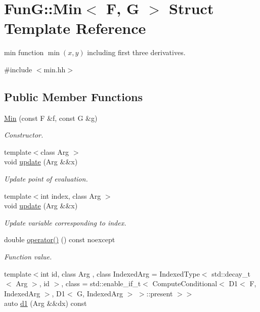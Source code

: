 \hypertarget{structFunG_1_1Min}{}\section{FunG\+:\+:Min$<$ F, G $>$ Struct Template Reference}
\label{structFunG_1_1Min}


min function $ \min(x,y) $ including first three derivatives.  




{\ttfamily \#include $<$min.\+hh$>$}

\subsection*{Public Member Functions}
\begin{DoxyCompactItemize}
\item 
\hyperlink{structFunG_1_1Min_afc46c17a7dfe4c0059c961d26c04ecaa}{Min} (const F \&f, const G \&g)
\begin{DoxyCompactList}\small\item\em Constructor. \end{DoxyCompactList}\item 
{\footnotesize template$<$class Arg $>$ }\\void \hyperlink{structFunG_1_1Min_a09c10a89b4f6c8129e08273f2048b352}{update} (Arg \&\&x)
\begin{DoxyCompactList}\small\item\em Update point of evaluation. \end{DoxyCompactList}\item 
{\footnotesize template$<$int index, class Arg $>$ }\\void \hyperlink{structFunG_1_1Min_a5d575265b40cefd19618662a0c79ffbd}{update} (Arg \&\&x)
\begin{DoxyCompactList}\small\item\em Update variable corresponding to index. \end{DoxyCompactList}\item 
double \hyperlink{structFunG_1_1Min_a7877e2f07798225fc3979d6414e882a5}{operator()} () const noexcept
\begin{DoxyCompactList}\small\item\em Function value. \end{DoxyCompactList}\item 
{\footnotesize template$<$int id, class Arg , class Indexed\+Arg  = Indexed\+Type$<$ std\+::decay\+\_\+t$<$ Arg $>$, id $>$, class  = std\+::enable\+\_\+if\+\_\+t$<$                       Compute\+Conditional$<$ D1$<$ F, Indexed\+Arg $>$, D1$<$ G, Indexed\+Arg $>$ $>$\+::present $>$$>$ }\\auto \hyperlink{structFunG_1_1Min_a0819114c8ea56ce33e41a24c9ebba3dd}{d1} (Arg \&\&dx) const 

\end{DoxyCompactItemize}
